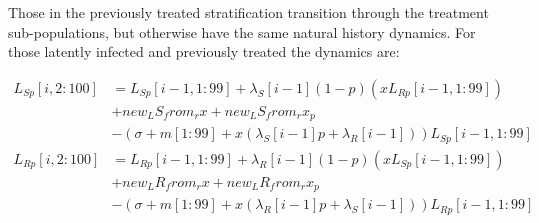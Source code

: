 \documentclass{article}
\begin{document}
Those in the previously treated stratification transition through the treatment sub-populations, but otherwise have the same natural history dynamics. For those latently infected and previously treated the dynamics are:

\begin{equation}
	\begin{split}
L_{Sp}[i,2:100] &= L_{Sp}[i-1,1:99] + \lambda_S[i-1](1 - p)(xL_{Rp}[i-1,1:99]) \\ & + new_LS_from_rx + new_LS_from_rx_p \\ & - (\sigma + m[1:99] + x(\lambda_S[i-1]p + \lambda_R[i-1]) )L_{Sp}[i-1,1:99] \\
L_{Rp}[i,2:100] &= L_{Rp}[i-1,1:99] + \lambda_R[i-1](1 - p)(xL_{Sp}[i-1,1:99]) \\ & + new_LR_from_rx + new_LR_from_rx_p \\ & - (\sigma + m[1:99] + x(\lambda_R[i-1]p + \lambda_S[i-1]) )L_{Rp}[i-1,1:99]
\end{split}
\end{equation}









% 
\end{document}
